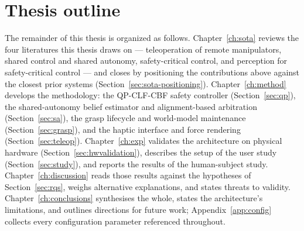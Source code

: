 \section{Thesis outline}
\label{sec:outline}

The remainder of this thesis is organized as follows. Chapter~\ref{ch:sota} reviews the four literatures this thesis draws on --- teleoperation of remote manipulators, shared control and shared autonomy, safety-critical control, and perception for safety-critical control --- and closes by positioning the contributions above against the closest prior systems (Section~\ref{sec:sota-positioning}). Chapter~\ref{ch:method} develops the methodology: the QP-CLF-CBF safety controller (Section~\ref{sec:qp}), the shared-autonomy belief estimator and alignment-based arbitration (Section~\ref{sec:sa}), the grasp lifecycle and world-model maintenance (Section~\ref{sec:grasp}), and the haptic interface and force rendering (Section~\ref{sec:teleop}). Chapter~\ref{ch:exp} validates the architecture on physical hardware (Section~\ref{sec:hwvalidation}), describes the setup of the user study (Section~\ref{sec:study}), and reports the results of the human-subject study. Chapter~\ref{ch:discussion} reads those results against the hypotheses of Section~\ref{sec:rqs}, weighs alternative explanations, and states threats to validity. Chapter~\ref{ch:conclusions} synthesises the whole, states the architecture's limitations, and outlines directions for future work; Appendix~\ref{app:config} collects every configuration parameter referenced throughout.

